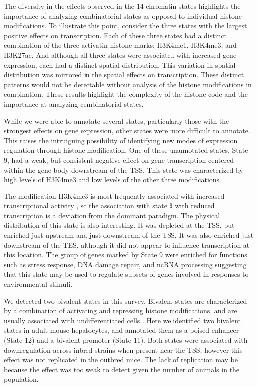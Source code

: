 \documentclass[
  11pt,
]{article}
\begin{document}
The diversity in the effects observed in the 14 chromatin states
highlights the importance of analyzing combinatorial states as opposed
to individual histone modifications. To illustrate this point, consider
the three states with the largest positive effects on transcription.
Each of these three states had a distinct combination of the three
activatin histone marks: H3K4me1, H3K4me3, and H3K27ac. And although all
three states were associated with increased gene expression, each had a
distinct spatial distribution. This variation in spatial distribution
was mirrored in the spatial effects on transcription. These distinct
patterns would not be detectable without analysis of the histone
modifications in combination. These results highlight the complexity of
the histone code and the importance at analyzing combinatorial states.

While we were able to annotate several states, particularly those with
the strongest effects on gene expression, other states were more
difficult to annotate. This raises the intruiguing possibility of
identifying new modes of expression regulation through histone
modification. One of these unannotated states, State 9, had a weak, but
consistent negative effect on gene transcription centered within the
gene body downstream of the TSS. This state was characterized by high
levels of H3K4me3 and low levels of the other three modifications.

The modification H3K4me3 is most frequently associated with increased
transcriptional activity
\citep{pmid15680324, pmid14661024, pmid12353038, pmid16728976}, so the
association with state 9 with reduced transcription is a deviation from
the dominant paradigm. The physical distribution of this state is also
interesting. It was depleted at the TSS, but enriched just upstream and
just downstream of the TSS. It was also enriched just downstream of the
TES, although it did not appear to influence transcription at this
location. The group of genes marked by State 9 were enriched for
functions such as stress response, DNA damage repair, and ncRNA
processing suggesting that this state may be used to regulate subsets of
genes involved in responses to environmental stimuli.

We detected two bivalent states in this survey. Bivalent states are
characterized by a combination of activating and repressing histone
modifications, and are usually associated with undifferentiated cells
\citep{pmid23788621, pmid22513113}. Here we identified two bivalent
states in adult mouse hepatocytes, and annotated them as a poised
enhancer (State 12) and a bivalent promoter (State 11). Both states were
associated with downregulation across inbred strains when present near
the TSS; however this effect was not replicated in the outbred mice. The
lack of replication may be because the effect was too weak to detect
given the number of animals in the population.
\end{document}
